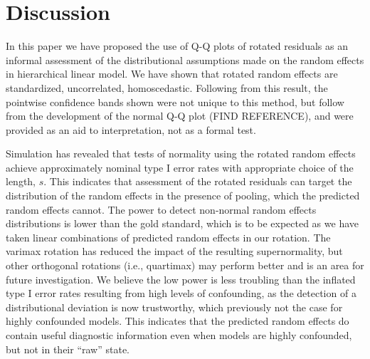 \documentclass[12pt]{article} %
\begin{document}

\section{Discussion}\label{sec:discussion}

In this paper we have proposed the use of Q-Q plots of rotated residuals as an informal assessment of the distributional assumptions made on the random effects in hierarchical linear model. We have shown that rotated random effects are standardized, uncorrelated, homoscedastic. Following from this result, the pointwise confidence bands shown were not unique to this method, but follow from the development of the normal Q-Q plot (FIND REFERENCE), and were provided as an aid to interpretation, not as a formal test.

Simulation has revealed that tests of normality using the rotated random effects achieve approximately nominal type I error rates with appropriate choice of the length, $s$. This indicates that assessment of the rotated residuals can target the distribution of the random effects in the presence of pooling, which the predicted random effects cannot. The power to detect non-normal random effects distributions is lower than the gold standard, which is to be expected as we have taken linear combinations of predicted random effects in our rotation. The varimax rotation has reduced the impact of the resulting supernormality, but other orthogonal rotations (i.e., quartimax) may perform better and is an area for future investigation. We believe the low power is less troubling than the inflated type I error rates resulting from high levels of confounding, as the detection of a distributional deviation is now trustworthy, which previously not the case for highly confounded models. This indicates that the predicted random effects do contain useful diagnostic information even when models are highly confounded, but not in their ``raw'' state.
 
\end{document}
